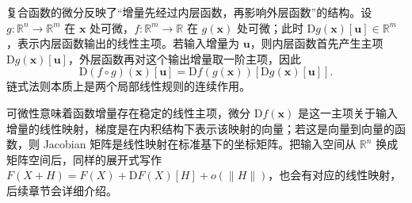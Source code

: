 复合函数的微分反映了“增量先经过内层函数，再影响外层函数”的结构。设 \(g:\mathbb{R}^n\to\mathbb{R}^m\) 在 \(\bm{x}\) 处可微，\(f:\mathbb{R}^m\to\mathbb{R}\) 在 \(g(\bm{x})\) 处可微；此时 \(\mathrm{D}g(\bm{x})[\bm{u}]\in\mathbb{R}^m\)，表示内层函数输出的线性主项。若输入增量为 \(\bm{u}\)，则内层函数首先产生主项 \(\mathrm{D}g(\bm{x})[\bm{u}]\)，外层函数再对这个输出增量取一阶主项，因此
\[
\mathrm{D}(f\circ g)(\bm{x})[\bm{u}]=\mathrm{D}f(g(\bm{x}))[\mathrm{D}g(\bm{x})[\bm{u}]].
\]
链式法则本质上是两个局部线性规则的连续作用。

可微性意味着函数增量存在稳定的线性主项，微分 \(\mathrm{D}f(\bm{x})\) 是这一主项关于输入增量的线性映射，梯度是在内积结构下表示该映射的向量；若这是向量到向量的函数，则 Jacobian 矩阵是线性映射在标准基下的坐标矩阵。把输入空间从 \(\mathbb{R}^n\) 换成矩阵空间后，同样的展开式写作 \(F(X+H)=F(X)+\mathrm{D}F(X)[H]+o(\|H\|)\)，也会有对应的线性映射，后续章节会详细介绍。
